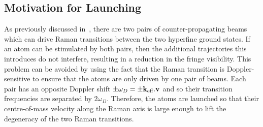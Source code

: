 \subsection{Motivation for Launching}\label{subsec:launching}
As previously discussed in~, there are two pairs of counter-propagating beams which can drive Raman transitions between the two hyperfine ground states. If an atom can be stimulated by both pairs, then the additional trajectories this introduces do not interfere, resulting in a reduction in the fringe visibility. This problem can be avoided by using the fact that the Raman transition is Doppler-sensitive to ensure that the atoms are only driven by one pair of beams. Each pair has an opposite Doppler shift \(\pm \omega_D = \pm {\textbf k_\textnormal{eff}}.\textbf{v}\) and so their transition frequencies are separated by \(2\omega_D\). Therefore, the atoms are launched so that their centre-of-mass velocity along the Raman axis is large enough to lift the degeneracy of the two Raman transitions. 

